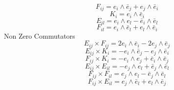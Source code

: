 \documentclass[12pt,fleqn]{report}
\begin{document}
\begin{equation*} F_{ij}  =  e_{i}\wedge \bar{e}_{j} + e_{j}\wedge \bar{e}_{i} \end{equation*}
\begin{equation*} K_{i}  =  e_{i}\wedge \bar{e}_{i} \end{equation*}
\begin{equation*} E_{il}  =  e_{i}\wedge e_{l} - \bar{e}_{i}\wedge \bar{e}_{l} \end{equation*}
\begin{equation*} F_{il}  =  e_{i}\wedge \bar{e}_{l} + e_{l}\wedge \bar{e}_{i} \end{equation*}
Non Zero Commutators
\begin{equation*} E_{ij}  \times F_{ij}  = 2 e_{i}\wedge \bar{e}_{i} -2 e_{j}\wedge \bar{e}_{j} \end{equation*}
\begin{equation*} E_{ij}  \times K_{i}  = - e_{i}\wedge \bar{e}_{j} - e_{j}\wedge \bar{e}_{i} \end{equation*}
\begin{equation*} F_{ij}  \times K_{i}  = - e_{i}\wedge e_{j} + \bar{e}_{i}\wedge \bar{e}_{j} \end{equation*}
\begin{equation*} E_{ij}  \times E_{il}  = - e_{j}\wedge e_{l} + \bar{e}_{j}\wedge \bar{e}_{l} \end{equation*}
\begin{equation*} F_{ij}  \times F_{il}  =  e_{j}\wedge e_{l} - \bar{e}_{j}\wedge \bar{e}_{l} \end{equation*}
\begin{equation*} F_{ij}  \times E_{il}  =  e_{j}\wedge \bar{e}_{l} + e_{l}\wedge \bar{e}_{j} \end{equation*}
\end{document}
